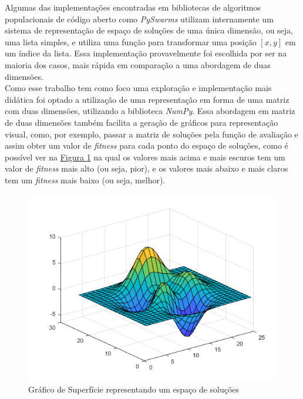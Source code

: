 Algumas das implementações encontradas em bibliotecas de algoritmos populacionais de código aberto como \textit{PySwarms} utilizam internamente um sistema de representação de espaço de soluções de uma única dimensão, ou seja, uma lista simples, e utiliza uma função para transformar uma posição $[x,y]$ em um índice da lista. Essa implementação provavelmente foi escolhida por ser na maioria dos casos, mais rápida em comparação a uma abordagem de duas dimensões.\\
\indent Como esse trabalho tem como foco uma exploração e implementação mais didática foi optado a utilização de uma representação em forma de uma matriz com duas dimensões, utilizando a biblioteca \textit{NumPy}. Essa abordagem em matriz de duas dimensões também facilita a geração de gráficos para representação visual, como, por exemplo, passar a matriz de soluções pela função de avaliação e assim obter um valor de \textit{fitness} para cada ponto do espaço de soluções, como é possível ver na 
\hyperref[fig:surfaceplot]{Figura \ref{fig:surfaceplot}} 
na qual os valores mais acima e mais escuros tem um valor de \textit{fitness} mais alto (ou seja, pior), e os valores mais abaixo e mais claros tem um \textit{fitness} mais baixo (ou seja, melhor).

\begin{figure}[ht]
    \centering
    \caption{Gráfico de Superfície representando um espaço de soluções}
    \label{fig:surfaceplot}
    \includegraphics[width=\textwidth]{assets/surfaceplot.png}
\end{figure}

